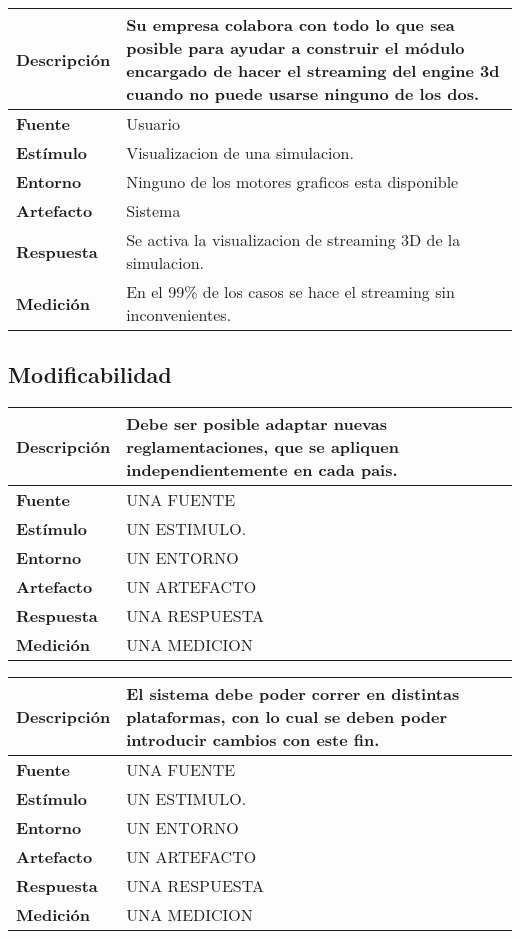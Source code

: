 \begin{center}
  \begin{tabular}{| l | p{10cm} | }
    \hline
  \textbf{Descripción} & Su empresa colabora con todo lo que sea posible para ayudar a construir el módulo encargado de hacer el streaming del engine 3d cuando no puede usarse ninguno de los dos.\\  \hline
  \textbf{Fuente} & Usuario\\  \hline
  \textbf{Estímulo} & Visualizacion de una simulacion.\\  \hline
  \textbf{Entorno} & Ninguno de los motores graficos esta disponible\\  \hline
  \textbf{Artefacto} & Sistema\\  \hline
  \textbf{Respuesta} & Se activa la visualizacion de streaming 3D de la simulacion.\\  \hline
  \textbf{Medición} & En el 99\% de los casos se hace el streaming sin inconvenientes.\\  \hline
  \end{tabular}
\end{center} 


\subsection{Modificabilidad}

\begin{center}
  \begin{tabular}{| l | p{10cm} | }
    \hline
  \textbf{Descripción} & Debe ser posible adaptar nuevas reglamentaciones, que se apliquen independientemente en cada pais.\\  \hline
  \textbf{Fuente} & UNA FUENTE\\  \hline
  \textbf{Estímulo} & UN ESTIMULO.\\  \hline
  \textbf{Entorno} & UN ENTORNO\\  \hline
  \textbf{Artefacto} & UN ARTEFACTO\\  \hline
  \textbf{Respuesta} & UNA RESPUESTA\\  \hline
  \textbf{Medición} & UNA MEDICION\\  \hline
  \end{tabular}
\end{center} 

\begin{center}
  \begin{tabular}{| l | p{10cm} | }
    \hline
  \textbf{Descripción} & El sistema debe poder correr en distintas plataformas, con lo cual se deben poder introducir cambios con este fin.\\  \hline
  \textbf{Fuente} & UNA FUENTE\\  \hline
  \textbf{Estímulo} & UN ESTIMULO.\\  \hline
  \textbf{Entorno} & UN ENTORNO\\  \hline
  \textbf{Artefacto} & UN ARTEFACTO\\  \hline
  \textbf{Respuesta} & UNA RESPUESTA\\  \hline
  \textbf{Medición} & UNA MEDICION\\  \hline
  \end{tabular}
\end{center} 

